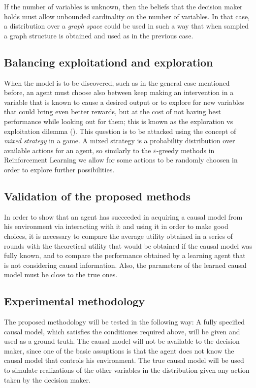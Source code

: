 \documentclass[english,letterpaper,12pt,final]{article}
\theoremstyle{definition}
\begin{document}
If the number of variables is unknown, then the beliefs that the decision maker holds must allow unbounded cardinality on the number of variables. In that case, a distribution over a \textit{graph space} could be used in such a way that when sampled a graph structure is obtained and used as in the previous case.  

\subsection{Balancing exploitationd and exploration}
When the model is to be discovered, such as in the general case mentioned before, an agent must choose also between keep making an intervention in a variable that is known to cause a desired output or to explore for new variables that could bring even better rewards, but at the cost of not having best performance while looking out for them; this is known as the exploration vs exploitation dilemma (\cite{sutton1998reinforcement}). This question is to be attacked using the concept of \textit{mixed strategy} in a game. A mixed strategy is a probability distribution over available actions for an agent, so similarly to the $\varepsilon$-greedy methods in Reinforcement Learning we allow for some actions to be randomly choosen in order to explore further possibilities.

\subsection{Validation of the proposed methods}
In order to show that an agent has succeeded in acquiring a causal model from his environment via interacting with it and using it in order to make good choices, it is necessary to compare the average utility obtained in a series of rounds with the theoretical utility that would be obtained if the causal model was fully known, and to compare the performance obtained by a learning agent that is not considering causal information. Also, the parameters of the learned causal model must be close to the true ones.


\subsection{Experimental methodology}
The proposed methodology will be tested in the following way: A fully specified causal model, which satisfies the conditiones required above, will be given and used as a ground truth. The causal model will not be available to the decision maker, since one of the basic assuptions is that the agent does not know the causal model that controls his environment. The true causal model will be used to simulate realizations of the other variables in the distribution given any action taken by the decision maker.
\end{document}
